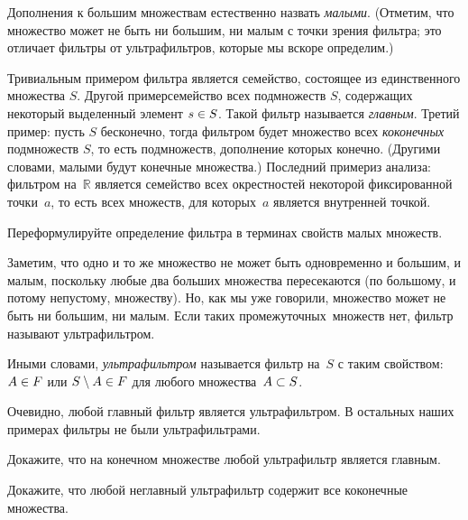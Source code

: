 Дополнения к большим множествам естественно назвать
\emph{малыми}.%
%
(Отметим, что множество может не быть ни большим,
ни малым с точки зрения фильтра; это отличает фильтры от ультрафильтров, которые мы
вскоре определим.)

Тривиальным примером фильтра является семейство, состоящее из
единственного множества $S$. Другой пример\т семейство всех
подмножеств $S$, содержащих некоторый выделенный элемент
$s\hm\in S$. Такой фильтр называется \emph{главным}.%
%
Третий
пример: пусть $S$ бесконечно, тогда фильтром будет множество
всех \emph{коконечных}%
%
подмножеств $S$, то есть подмножеств,
дополнение которых конечно. (Другими словами, малыми будут
конечные множества.) Последний пример\т из анализа: фильтром
на~$\mathbb{R}$ является семейство всех окрестностей некоторой
фиксированной точки~$a$, то есть всех множеств, для которых~$a$
является внутренней точкой.

\begin{problem}
Переформулируйте определение фильтра в терминах свойств малых множеств.
\end{problem}

Заметим, что одно и то же множество не может быть одновременно и
большим, и малым, поскольку любые два больших множества
пересекаются (по большому, и потому непустому, множеству). Но,
как мы уже говорили, множество может не быть ни большим, ни
малым. Если таких  промежуточных\ множеств нет, фильтр
называют ультрафильтром.

Иными словами, \emph{ультрафильтром}%
называется фильтр на~$S$ с
таким свойством: $A\hm\in F$ или ${S\setminus A}\hm\in F$ для
любого множества~$A\hm\subset S$.

Очевидно, любой главный фильтр является ультрафильтром. В
остальных наших примерах фильтры не были ультрафильтрами.

\begin{problem}
        \label{finite-ultrafilter}%
Докажите, что на конечном множестве любой ультрафильтр является
главным.
\end{problem}

\begin{problem}
Докажите, что любой неглавный ультрафильтр содержит все
коконечные множества.
\end{problem}

